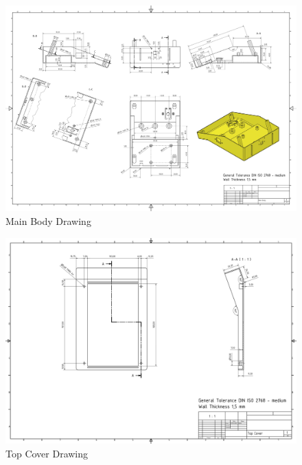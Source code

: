 \begin{figure}[H]
    \centering
    \includegraphics[width=1.3\linewidth, angle = 90]{texs/appendix/data/technicaldrawing/mainbody.jpg}
    \caption{Main Body Drawing}
    \label{fig:cad-drawing-mainbody}
\end{figure}

\begin{figure}[H]
    \centering
    \includegraphics[width=1.3\linewidth, angle = 90]{texs/appendix/data/technicaldrawing/topcover.jpg}
    \caption{Top Cover Drawing}
    \label{fig:cad-drawing-topcover}
\end{figure}

